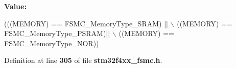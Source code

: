 {\bfseries Value\+:}
\begin{DoxyCode}
(((MEMORY) == FSMC_MemoryType_SRAM) || \(\backslash\)
                                ((MEMORY) == FSMC_MemoryType_PSRAM)|| \(\backslash\)
                                ((MEMORY) == FSMC_MemoryType_NOR))
\end{DoxyCode}


Definition at line \textbf{ 305} of file \textbf{ stm32f4xx\+\_\+fsmc.\+h}.

